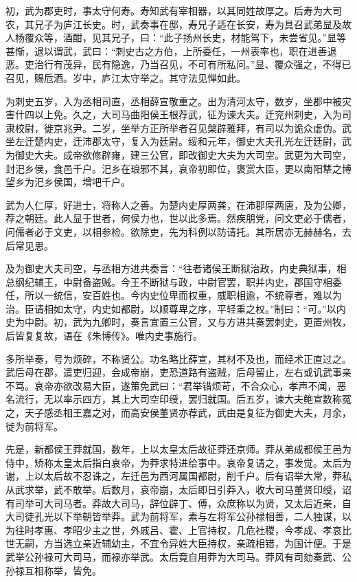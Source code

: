\documentclass[]{article}
\begin{document}
初，武为郡吏时，事太守何寿。寿知武有宰相器，以其同姓故厚之。后寿为大司农，其兄子为庐江长史。时，武奏事在邸，寿兄子适在长安，寿为具召武弟显及故人杨覆众等，酒酣，见其兄子，曰：``此子扬州长史，材能驾下，未尝省见。''显等甚惭，退以谓武，武曰：``刺史古之方伯，上所委任，一州表率也，职在进善退恶。吏治行有茂异，民有隐逸，乃当召见，不可有所私问。''显、覆众强之，不得已召见，赐卮酒。岁中，庐江太守举之。其守法见惮如此。

为刺史五岁，入为丞相司直，丞相薛宣敬重之。出为清河太守，数岁，坐郡中被灾害什四以上免。久之，大司马曲阳侯王根荐武，征为谏大夫。迁兖州刺史，入为司隶校尉，徙京兆尹。二岁，坐举方正所举者召见槃辟雅拜，有司以为诡众虚伪。武坐左迁楚内史，迁沛郡太守，复入为廷尉。绥和元年，御史大夫孔光左迁廷尉，武为御史大夫。成帝欲修辟雍，建三公官，即改御史大夫为大司空。武更为大司空，封汜乡侯，食邑千户。汜乡在琅邪不其，哀帝初即位，褒赏大臣，更以南阳犨之博望乡为汜乡侯国，增吧千户。

武为人仁厚，好进士，将称人之善。为楚内史厚两龚，在沛郡厚两唐，及为公卿，荐之朝廷。此人显于世者，何侯力也，世以此多焉。然疾朋党，问文吏必于儒者，问儒者必于文吏，以相参检。欲除吏，先为科例以防请托。其所居亦无赫赫名，去后常见思。

及为御史大夫司空，与丞相方进共奏言：``往者诸侯王断狱治政，内史典狱事，相总纲纪辅王，中尉备盗贼。今王不断狱与政，中尉官罢，职并内史，郡国守相委任，所以一统信，安百姓也。今内史位卑而权重，威职相逾，不统尊者，难以为治。臣请相如太守，内史如都尉，以顺尊卑之序，平轻重之权。''制曰：``可。''以内史为中尉。初，武为九卿时，奏言宜置三公官，又与方进共奏罢刺史，更置州牧，后皆复复故，语在《朱博传》。唯内史事施行。

多所举奏，号为烦碎，不称贤公。功名略比薛宣，其材不及也，而经术正直过之。武后母在郡，遣吏归迎，会成帝崩，吏恐道路有盗贼，后母留止，左右或讥武事亲不笃。哀帝亦欲改易大臣，遂策免武曰：``君举错烦苛，不合众心，孝声不闻，恶名流行，无以率示四方，其上大司空印绶，罢归就国。后五岁，谏大夫鲍宣数称冤之，天子感丞相王嘉之对，而高安侯董贤亦荐武，武由是复征为御史大夫，月余，徙为前将军。

先是，新都侯王莽就国，数年，上以太皇太后故征莽还京师。莽从弟成都侯王邑为侍中，矫称太皇太后指白哀帝，为莽求特进给事中。哀帝复请之，事发觉。太后为谢，上以太后故不忍诛之，左迁邑为西河属国都尉，削千户。后有诏举大常，莽私从武求举，武不敢举。后数月，哀帝崩，太后即日引莽入，收大司马董贤印绶，诏有司举可大司马者。莽故大司马，辞位辟丁、傅，众庶称以为贤，又太后近亲，自大司徒孔光以下举朝皆举莽。武为前将军，素与左将军公孙禄相善，二人独谋，以为往时孝惠、孝昭少主之世，外戚吕、霍、上官持权，几危社稷，今孝成、孝哀比世无嗣，方当选立亲近辅幼主，不宜令异姓大臣持权，亲疏相错，为国计便。于是武举公孙禄可大司马，而禄亦举武。太后竟自用莽为大司马。莽风有司劾奏武、公孙禄互相称举，皆免。
\end{document}
